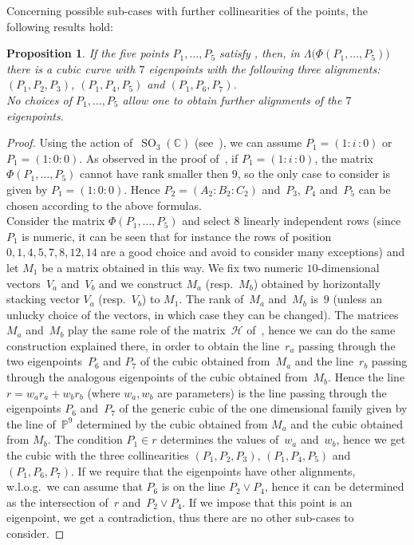 \documentclass[a4paper, 11pt, reqno]{amsart}
\theoremstyle{plain}
\newtheorem{prop}[lemma]{Proposition}
\theoremstyle{definition}
\newcommand{\C}{\mathbb{C}}
\newcommand{\p}{\mathbb{P}}
\newcommand{\iii}{\textit{i}\,}
\newcommand{\SO}{\operatorname{SO}}
\begin{document}
Concerning possible sub-cases with further collinearities of the points,
the following results hold:
\begin{prop}
\label{three_d_three_alignments}
If the five points $P_1, \dots, P_5$ satisfy ,
then, in $\Lambda \bigl( \Phi(P_1, \dotsc, P_5)\bigr)$ there is
a cubic curve with $7$ eigenpoints with the following three alignments:
$(P_1, P_2, P_3)$, $(P_1, P_4, P_5)$ and $(P_1, P_6, P_7)$. \\
No choices of $P_1, \dots, P_5$ allow one to obtain further alignments of the
$7$ eigenpoints.
\end{prop}
%
\begin{proof}
Using the action of~$\SO_3(\C)$ (see~),
we can assume $P_1= (1: \iii: 0)$ or $P_1= (1: 0: 0)$. As observed
in the proof of~, if $P_1 = (1: \iii: 0)$,
the matrix
$\Phi(P_1, \dots, P_5)$ cannot have rank smaller then $9$, so the only
case to consider is given by $P_1 = (1: 0: 0)$. Hence
$P_2 = (A_2: B_2: C_2)$ and~$P_3$, $P_4$ and~$P_5$ can be chosen according 
to the above formulas.\\
Consider the matrix $\Phi(P_1, \dots, P_5)$ and select $8$ linearly independent
rows (since $P_1$ is numeric, it can be seen that for instance the rows
of position $0, 1, 4, 5, 7, 8, 12, 14$ are a good choice and avoid to consider
many exceptions) and let $M_1$ be a matrix obtained in this way.
We fix two numeric $10$-dimensional vectors~$V_a$ and~$V_b$ and we construct
$M_a$ (resp.\ $M_b$) obtained by horizontally stacking vector
$V_a$ (resp.\ $V_b$)
to $M_1$. The rank of~$M_a$ and~$M_b$ is~$9$ (unless an unlucky choice
of the vectors, in which case they can be changed). The matrices~$M_a$ and~$M_b$ 
play the same role of the matrix~$\mathcal{H}$
of~, hence we can do the same construction explained
there, in order to obtain the line~$r_a$ passing through the two
eigenpoints~$P_6$ and $P_7$ of the cubic obtained from~$M_a$ and the
line~$r_b$ passing through the analogous eigenpoints of the cubic
obtained from~$M_b$.
Hence the line $r = w_ar_a+w_br_b$
(where $w_a, w_b$ are parameters) is the line passing through the eigenpoints
$P_6$ and~$P_7$
of the generic cubic of the one dimensional family given by the line
of~$\p^9$ determined by the cubic obtained from $M_a$ and
the cubic obtained from $M_b$. The condition $P_1 \in r$
determines the values of~$w_a$ and~$w_b$, hence we get the cubic
with the three collinearities $(P_1, P_2, P_3)$,
$(P_1, P_4, P_5)$ and~$(P_1, P_6, P_7)$. If we require that the eigenpoints 
have other alignments, w.l.o.g.\ we can assume that $P_6$ is on the line 
$P_2 \vee P_4$, hence it can be determined as the intersection of~$r$
and~$P_2 \vee P_4$. If we impose that this point is an eigenpoint, we get
a contradiction, thus there are no other sub-cases to consider.   
\end{proof}
\end{document}
